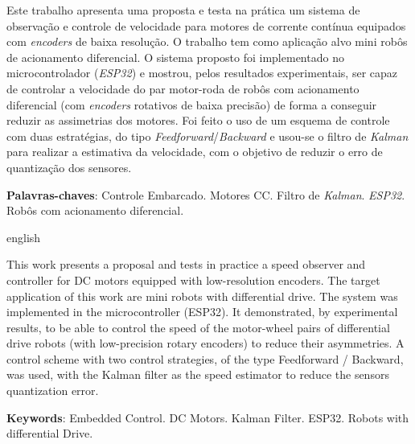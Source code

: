 \setlength{\absparsep}{18pt} %
\begin{resumo}

Este trabalho apresenta uma proposta e testa na prática um sistema de observação e controle de velocidade para motores de corrente contínua equipados com \emph{encoders} de baixa resolução. O trabalho tem como aplicação alvo mini robôs de acionamento diferencial. O sistema proposto foi implementado no microcontrolador (\emph{ESP32}) e mostrou, pelos resultados experimentais, ser capaz de controlar a velocidade do par motor-roda de robôs com acionamento diferencial (com \emph{encoders} rotativos de baixa precisão) de forma a conseguir reduzir as assimetrias dos motores. Foi feito o uso de um esquema de controle com duas estratégias, do tipo \emph{Feedforward}/\emph{Backward} e usou-se o filtro de \emph{Kalman} para realizar a estimativa da velocidade, com o objetivo de reduzir o erro de quantização dos sensores.

 
 \textbf{Palavras-chaves}: Controle Embarcado. Motores CC. Filtro de \emph{Kalman}. \emph{ESP32}. Robôs com acionamento diferencial.
\end{resumo}
\begin{resumo}[Abstract]
	\begin{otherlanguage*}{english}
	
		This work presents a proposal and tests in practice a speed observer and controller for DC motors equipped with low-resolution encoders. The target application of this work are mini robots with differential drive. The system was implemented in the microcontroller (ESP32). It demonstrated, by experimental results, to be able to control the speed of the motor-wheel pairs of differential drive robots (with low-precision rotary encoders) to reduce their asymmetries. A control scheme with two control strategies, of the type Feedforward / Backward, was used, with the Kalman filter as the speed estimator to reduce the sensors quantization error.
	
	\vspace{\onelineskip}
	\noindent 
	\textbf{Keywords}: Embedded Control. DC Motors. Kalman Filter. ESP32. Robots with differential Drive.
	\end{otherlanguage*}
\end{resumo}